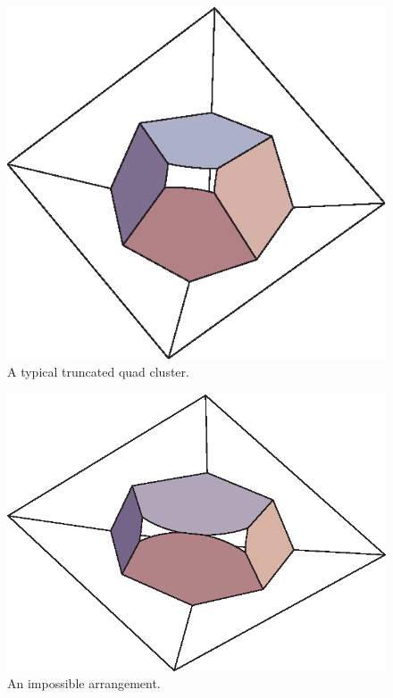 \begin{figure}
\begin{center}
\includegraphics{PS/vor3}
\end{center}
\caption{A typical truncated quad cluster.}
\label{fig:vor3}
\end{figure}

\begin{figure}
\begin{center}
\includegraphics{PS/vor2}
\end{center}
\caption{An impossible arrangement.}
\label{fig:vor2}
\end{figure}

